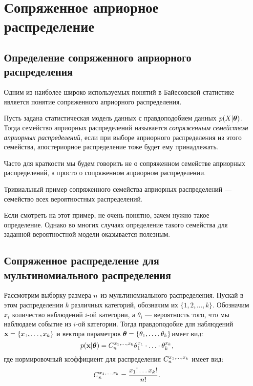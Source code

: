

\section{Сопряженное априорное распределение}

\subsection{Определение сопряженного априорного распределения}

Одним из наиболее широко используемых понятий в Байесовской статистике является понятие сопряженного априорного распределения.

\begin{Definition}
Пусть задана статистическая модель данных с правдоподобием данных $p(X | \boldsymbol{\theta})$.
Тогда семейство априорных распределений называется \emph{сопряженным семейством априорных распределений}, если 
при выборе априорного распределения из этого семейства,
апостериорное распределение тоже будет ему принадлежать.
\end{Definition}

Часто для краткости мы будем говорить не о сопряженном семействе априорных распределений, а просто о сопряженном априорном распределении.

\begin{example}
Тривиальный пример сопряженного семейства априорных распределений --- семейство всех вероятностных распределений.
\end{example}

Если смотреть на этот пример, не очень понятно, зачем нужно такое определение.
Однако во многих случаях определение такого семейства 
для заданной вероятностной модели оказывается полезным.

\subsection{Сопряженное распределение для мультиномиального распределения}

Рассмотрим выборку размера $n$ из мультиномиального распределения.
Пускай в этом распределении $k$ различных категорий, обозначим их $\{1, 2, \ldots, k\}$.
Обозначим $x_i$ количество наблюдений $i$-ой категории, 
а $\theta_i$ --- вероятность того, что мы наблюдаем событие из $i$-ой категории.
Тогда правдоподобие для наблюдений $\mathbf{x} = \{x_1, \ldots, x_k\}$ и вектора параметров $\boldsymbol{\theta} = \{\theta_1, \ldots, \theta_k\}$имеет вид:
\[
p(\mathbf{x} | \boldsymbol{\theta}) = C_{n}^{x_1, \ldots, x_k} \theta_1^{x_1} \cdot \ldots \cdot \theta_k^{x_k},
\]
где нормировочный коэффициент для распределения $C_{n}^{x_1, \ldots, x_k}$ имеет вид:
\[
C_{n}^{x_1, \ldots, x_k} = \frac{x_1! \ldots x_k!}{n!}.
\]

